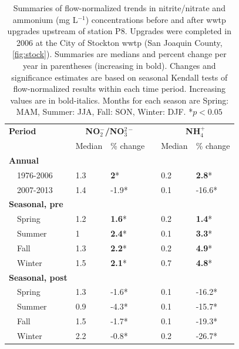 \documentclass[letterpaper,12pt,oneside]{article}\usepackage[]{graphicx}\usepackage[]{color}
\newcommand{\beginsupplement}{%
        \setcounter{table}{0}
        \renewcommand{\thetable}{S\arabic{table}}%
        \setcounter{figure}{0}
        \renewcommand{\thefigure}{S\arabic{figure}}%
     }
\begin{document}
\begin{table}[!tbp]
\caption{Summaries of flow-normalized trends in nitrite/nitrate and ammonium (mg L$^{-1}$) concentrations before and after \ac{wwtp} upgrades upstream of station P8. Upgrades were completed in 2006 at the City of Stockton \ac{wwtp} (San Joaquin County, \cref{fig:stock}). Summaries are  medians and percent change per year in parentheses (increasing in bold).  Changes and significance estimates are based on seasonal Kendall tests of flow-normalized results within each time period. Increasing values are in bold-italics. Months for each season are Spring: MAM, Summer: JJA, Fall: SON, Winter: DJF. *$p<0.05$\label{tab:p8chg}} 
\begin{center}
\begin{tabular}{lllcll}
\hline\hline
\multicolumn{1}{l}{\bfseries Period}&\multicolumn{2}{c}{\bfseries NO$_{2}^{-}$/NO$_{3}^{2-}$}&\multicolumn{1}{c}{\bfseries }&\multicolumn{2}{c}{\bfseries NH$_{4}^{+}$}\tabularnewline
\cline{2-3} \cline{5-6}
\multicolumn{1}{l}{}&\multicolumn{1}{c}{Median}&\multicolumn{1}{c}{\% change}&\multicolumn{1}{c}{}&\multicolumn{1}{c}{Median}&\multicolumn{1}{c}{\% change}\tabularnewline
\hline
{\bfseries Annual}&&&&&\tabularnewline
~~1976-2006&1.3&\textbf{2}*&&0.2&\textbf{2.8}*\tabularnewline
~~2007-2013&1.4&-1.9*&&0.1&-16.6*\tabularnewline
\hline
{\bfseries Seasonal, pre}&&&&&\tabularnewline
~~Spring&1.2&\textbf{1.6}*&&0.2&\textbf{1.4}*\tabularnewline
~~Summer&1&\textbf{2.4}*&&0.1&\textbf{3.3}*\tabularnewline
~~Fall&1.3&\textbf{2.2}*&&0.2&\textbf{4.9}*\tabularnewline
~~Winter&1.5&\textbf{2.1}*&&0.7&\textbf{4.8}*\tabularnewline
\hline
{\bfseries Seasonal, post}&&&&&\tabularnewline
~~Spring&1.3&-1.6*&&0.1&-16.2*\tabularnewline
~~Summer&0.9&-4.3*&&0.1&-15.7*\tabularnewline
~~Fall&1.5&-1.7*&&0.1&-19.3*\tabularnewline
~~Winter&2.2&-0.8*&&0.2&-26.7*\tabularnewline
\hline
\end{tabular}\end{center}
\end{table}


\clearpage

\beginsupplement
\end{document}
